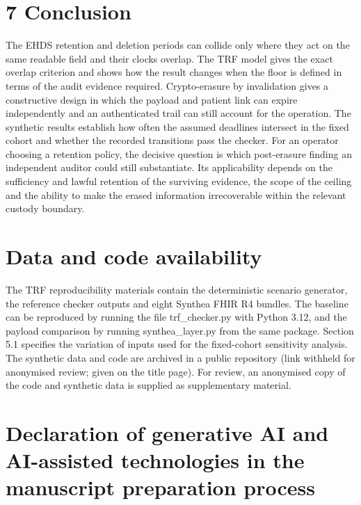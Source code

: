 \documentclass[preprint,review,12pt]{elsarticle}
\begin{document}
\hypertarget{conclusion}{%
\section{7 Conclusion}\label{conclusion}}

The EHDS retention and deletion periods can collide only where they act
on the same readable field and their clocks overlap. The TRF model gives
the exact overlap criterion and shows how the result changes when the
floor is defined in terms of the audit evidence required. Crypto-erasure
by invalidation gives a constructive design in which the payload and
patient link can expire independently and an authenticated trail can
still account for the operation. The synthetic results establish how
often the assumed deadlines intersect in the fixed cohort and whether
the recorded transitions pass the checker. For an operator choosing a
retention policy, the decisive question is which post-erasure finding an
independent auditor could still substantiate. Its applicability depends
on the sufficiency and lawful retention of the surviving evidence, the
scope of the ceiling and the ability to make the erased information
irrecoverable within the relevant custody boundary.

\hypertarget{data-and-code-availability}{%
\section{Data and code availability}\label{data-and-code-availability}}

The TRF reproducibility materials contain the deterministic scenario
generator, the reference checker outputs and eight Synthea FHIR R4
bundles. The baseline can be reproduced by running the file
trf\_checker.py with Python 3.12, and the payload comparison by running
synthea\_layer.py from the same package. Section 5.1 specifies the
variation of inputs used for the fixed-cohort sensitivity analysis. The
synthetic data and code are archived in a public repository (link
withheld for anonymised review; given on the title page). For review, an
anonymised copy of the code and synthetic data is supplied as
supplementary material.

\hypertarget{declaration-of-generative-ai-and-ai-assisted-technologies-in-the-manuscript-preparation-process}{%
\section{Declaration of generative AI and AI-assisted technologies in
the manuscript preparation
process}\label{declaration-of-generative-ai-and-ai-assisted-technologies-in-the-manuscript-preparation-process}}
\end{document}
